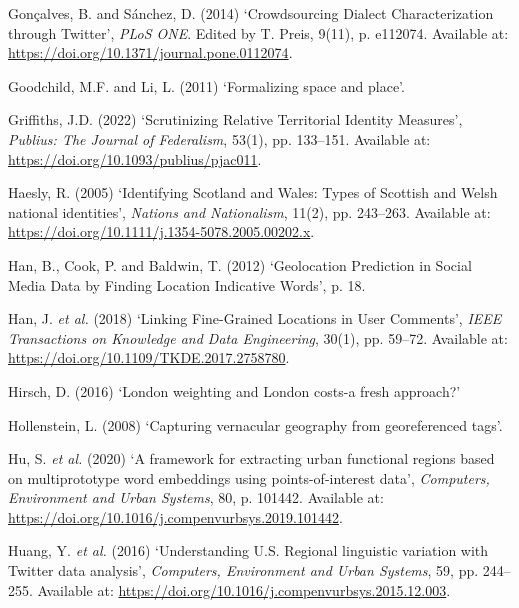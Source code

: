 \documentclass[
]{article}
\newlength{\cslhangindent}
\newenvironment{CSLReferences}[2] %
 {\begin{list}{}{%
  \setlength{\itemindent}{0pt}
  \setlength{\leftmargin}{0pt}
  \setlength{\parsep}{0pt}
  \ifodd #1
   \setlength{\leftmargin}{\cslhangindent}
   \setlength{\itemindent}{-1\cslhangindent}
  \fi
  \setlength{\itemsep}{#2\baselineskip}}}
 {\end{list}}
\begin{document}
\begin{CSLReferences}{0}{1}
Gonçalves, B. and Sánchez, D. (2014) {`Crowdsourcing {Dialect
Characterization} through {Twitter}'}, \emph{PLoS ONE}. Edited by T.
Preis, 9(11), p. e112074. Available at:
\url{https://doi.org/10.1371/journal.pone.0112074}.

Goodchild, M.F. and Li, L. (2011) {`Formalizing space and place'}.

Griffiths, J.D. (2022) {`Scrutinizing {Relative Territorial Identity
Measures}'}, \emph{Publius: The Journal of Federalism}, 53(1), pp.
133--151. Available at: \url{https://doi.org/10.1093/publius/pjac011}.

Haesly, R. (2005) {`Identifying {Scotland} and {Wales}: Types of
{Scottish} and {Welsh} national identities'}, \emph{Nations and
Nationalism}, 11(2), pp. 243--263. Available at:
\url{https://doi.org/10.1111/j.1354-5078.2005.00202.x}.

Han, B., Cook, P. and Baldwin, T. (2012) {`Geolocation {Prediction} in
{Social Media Data} by {Finding Location Indicative Words}'}, p. 18.

Han, J. \emph{et al.} (2018) {`Linking {Fine-Grained Locations} in {User
Comments}'}, \emph{IEEE Transactions on Knowledge and Data Engineering},
30(1), pp. 59--72. Available at:
\url{https://doi.org/10.1109/TKDE.2017.2758780}.

Hirsch, D. (2016) {`London weighting and {London} costs-a fresh
approach?'}

Hollenstein, L. (2008) {`Capturing vernacular geography from
georeferenced tags'}.

Hu, S. \emph{et al.} (2020) {`A framework for extracting urban
functional regions based on multiprototype word embeddings using
points-of-interest data'}, \emph{Computers, Environment and Urban
Systems}, 80, p. 101442. Available at:
\url{https://doi.org/10.1016/j.compenvurbsys.2019.101442}.

Huang, Y. \emph{et al.} (2016) {`Understanding {U}.{S}. Regional
linguistic variation with {Twitter} data analysis'}, \emph{Computers,
Environment and Urban Systems}, 59, pp. 244--255. Available at:
\url{https://doi.org/10.1016/j.compenvurbsys.2015.12.003}.


\end{CSLReferences}
\end{document}
